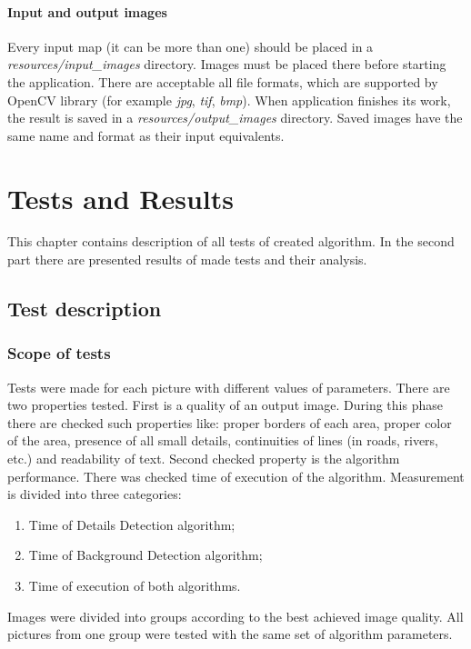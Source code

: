 \documentclass[a4paper,onecolumn,oneside,12pt]{memoir}
\begin{document}
\subsubsection{Input and output images}

Every input map (it can be more than one) should be placed in a \textit{resources/input\_images}
directory. Images must be placed there before starting the application. There are acceptable all
file formats, which are supported by OpenCV library (for example \textit{jpg}, \textit{tif},
\textit{bmp}).
When application finishes its work, the result is saved in a \textit{resources/output\_images}
directory. Saved images have the same name and format as their input equivalents.

\chapter{Tests and Results}

This chapter contains description of all tests of created algorithm. In the second part there are
presented results of made tests and their analysis.

\section{Test description}

\subsection{Scope of tests}

Tests were made for each picture with different values of parameters. There are two properties
tested. First is a quality of an output image. During this phase there are checked such properties
like: proper borders of each area, proper color of the area, presence of all small details,
continuities of lines (in roads, rivers, etc.) and readability of text. Second checked property is
the algorithm performance. There was checked time of execution of the algorithm. Measurement is
divided into three categories:
\begin{enumerate}
  \item Time of Details Detection algorithm;
  \item Time of Background Detection algorithm;
  \item Time of execution of both algorithms.
\end{enumerate}

Images were divided into groups according to the best achieved image quality. All pictures from one
group were tested with the same set of algorithm parameters.
\end{document}
